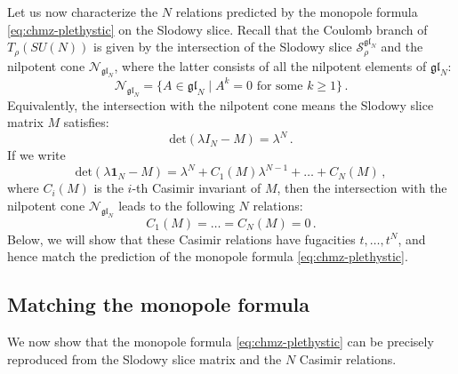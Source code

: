 \documentclass[12pt,a4paper]{article}
\begin{document}
\medskip
Let us now characterize the $N$ relations predicted by the monopole formula \eqref{eq:chmz-plethystic} on the Slodowy slice. Recall that the Coulomb branch of $T_{\rho}(SU(N))$ is given by the intersection of the Slodowy slice $\mathcal S^{\mathfrak{gl}_N}_\rho$ and the nilpotent cone $\mathcal{N}_{\mathfrak{gl}_N}$, where the latter consists of all the nilpotent  elements of $\mathfrak{gl}_N$:
\begin{equation}
    \mathcal{N}_{\mathfrak{gl}_N}=\{A\in \mathfrak{gl}_N\mid A^k=0 \text{ for some }k\geq1 \}\,.
\end{equation}
Equivalently, the intersection with the nilpotent cone means the Slodowy slice matrix $M$ satisfies:
\begin{equation}
    \text{det}(\lambda I_N-M)=\lambda ^N\,.
\end{equation}
If we write 
\begin{equation}\label{eq:casimir-coeff}
    \text{det}(\lambda \mathbf 1_N-M)=\lambda ^N+C_1(M)\lambda^{N-1}+\dots+C_N(M)\,,
\end{equation}
where $C_i(M)$ is the $i$-th Casimir invariant of $M$, then the intersection with the nilpotent cone $ \mathcal{N}_{\mathfrak{gl}_N}$ leads to the following $N$ relations:
\begin{equation}
    C_1(M)=\dots=C_N(M)=0\,.
    \label{eq:casimir-relations}
\end{equation}
Below, we will show that these Casimir relations have  fugacities $t,\dots,t^N$, and hence match the prediction of the monopole formula \eqref{eq:chmz-plethystic}.


\subsection{Matching the monopole formula}
We now show that the monopole formula \eqref{eq:chmz-plethystic} can be precisely reproduced from the Slodowy slice matrix and the $N$ Casimir relations. 
\end{document}
